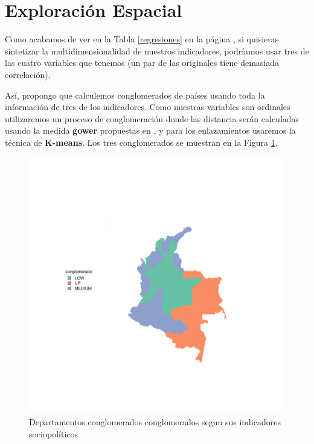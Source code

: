 \documentclass{article}
\begin{document}
\section{Exploración Espacial}


Como acabamos de ver en la Tabla \ref{regresiones} en la página \pageref{regresiones}, si quisieras sintetizar la multidimensionalidad de nuestros indicadores, podríamos usar tres de las cuatro variables que tenemos (un par de las originales tiene demasiada correlación). 

Así, propongo que calculemos conglomerados de países usando toda la información de tres de los indicadores. Como nuestras variables son ordinales utilizaremos un proceso de conglomeración donde las distancia serán calculadas usando la medida {\bf gower} propuestas en \cite{macqueen_methods_nodate}, y para los enlazamientos usaremos la técnica de {\bf K-means}. Los tres conglomerados se muestran en la Figura \ref{clustmap}.



\begin{figure}[h]
\centering
\includegraphics{Articulo1-plotMap1}
\caption{Departamentos conglomerados conglomerados segun sus indicadores sociopolíticos}\label{clustmap}
\end{figure}



\renewcommand{\refname}{Bibliografia}

\end{document}
